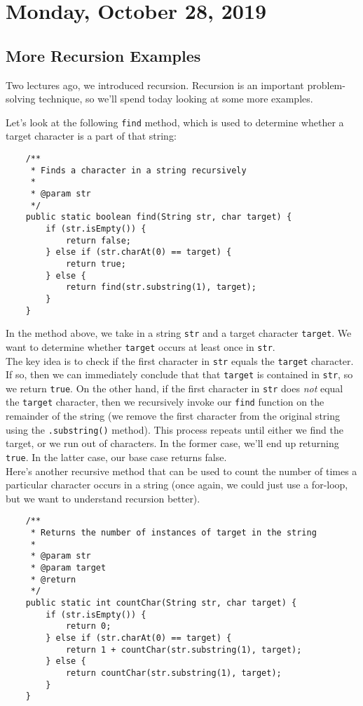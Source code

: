 \section{Monday, October 28, 2019}


\subsection{More Recursion Examples}

Two lectures ago, we introduced recursion. Recursion is an important problem-solving technique, so we'll spend today looking at some more examples.

Let's look at the following \verb!find! method, which is used to determine whether a target character is a part of that string:

\begin{lstlisting}
	/**
	 * Finds a character in a string recursively
	 * 
	 * @param str
	 */
	public static boolean find(String str, char target) {
		if (str.isEmpty()) {
			return false;
		} else if (str.charAt(0) == target) {
			return true;
		} else {
			return find(str.substring(1), target);
		}
	}
\end{lstlisting}

In the method above, we take in a string \verb!str! and a target character \verb!target!. We want to determine whether \verb!target! occurs at least once in \verb!str!. \\

The key idea is to check if the first character in \verb!str! equals the \verb!target! character. If so, then we can immediately conclude that that \verb!target! is contained in \verb!str!, so we return \verb!true!. On the other hand, if the first character in \verb!str! does \textit{not} equal the \verb!target! character, then we recursively invoke our \verb!find! function on the remainder of the string (we remove the first character from the original string using the \verb!.substring()! method). This process repeats until either we find the target, or we run out of characters. In the former case, we'll end up returning \verb!true!. In the latter case, our base case returns false. \\


Here's another recursive method that can be used to count the number of times a particular character occurs in a string (once again, we could just use a for-loop, but we want to understand recursion better). 

\begin{lstlisting}
	/**
	 * Returns the number of instances of target in the string
	 * 
	 * @param str
	 * @param target
	 * @return
	 */
	public static int countChar(String str, char target) {
		if (str.isEmpty()) {
			return 0;
		} else if (str.charAt(0) == target) {
			return 1 + countChar(str.substring(1), target);
		} else {
			return countChar(str.substring(1), target);
		}
	}
\end{lstlisting}

